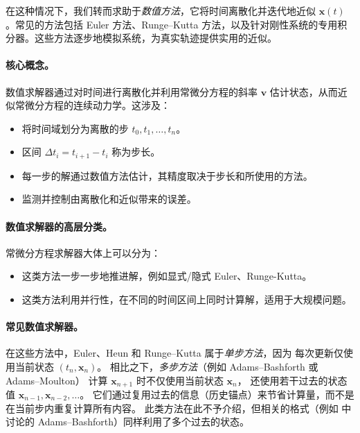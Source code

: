 在这种情况下，我们转而求助于\emph{数值方法}，它将时间离散化并迭代地近似 $\mathbf{x}(t)$。常见的方法包括 Euler 方法、Runge–Kutta 方法，以及针对刚性系统的专用积分器。这些方法逐步地模拟系统，为真实轨迹提供实用的近似。





\paragraph{核心概念。}
数值求解器通过对时间进行离散化并利用常微分方程的斜率 $\mathbf{v}$ 估计状态，从而近似常微分方程的连续动力学。这涉及：
\begin{itemize}
    \item {} 将时间域划分为离散的步 $t_0, t_1, \dots, t_n$。
    \item {} 区间 $\Delta t_i = t_{i+1} - t_i$ 称为步长。
    \item {} 每一步的解通过数值方法估计，其精度取决于步长和所使用的方法。
    \item {} 监测并控制由离散化和近似带来的误差。
\end{itemize}

\paragraph{数值求解器的高层分类。}
常微分方程求解器大体上可以分为：
\begin{itemize}
    \item {} 这类方法一步一步地推进解，例如显式/隐式 Euler、Runge-Kutta。
    \item {} 这类方法利用并行性，在不同的时间区间上同时计算解，适用于大规模问题。
\end{itemize}

\paragraph{常见数值求解器。} 在这些方法中，Euler、Heun 和 Runge--Kutta 属于\emph{单步方法}，因为
每次更新仅使用当前状态 $(t_n,\mathbf{x}_n)$。
相比之下，\emph{多步方法}（例如 Adams--Bashforth 或 Adams--Moulton）
计算 $\mathbf{x}_{n+1}$ 时不仅使用当前状态 $\mathbf{x}_n$，
还使用若干过去的状态值 $\mathbf{x}_{n-1}, \mathbf{x}_{n-2}, \dots$。
它们通过复用过去的信息（历史锚点）来节省计算量，而不是在当前步内重复计算所有内容。
此类方法在此不予介绍，但相关的格式（例如  中讨论的 Adams--Bashforth）同样利用了多个过去的状态。

